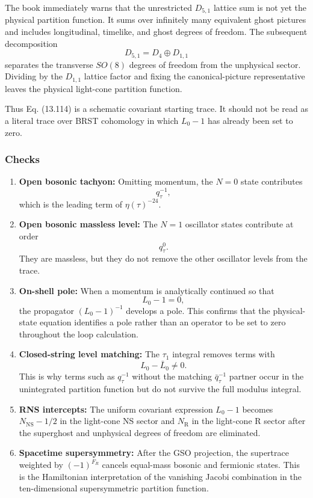 \documentclass[
  10pt,
  a4paper,
  openany]{book}
\begin{document}
The book immediately warns that the unrestricted \(D_{5,1}\) lattice sum
is not yet the physical partition function. It sums over infinitely many
equivalent ghost pictures and includes longitudinal, timelike, and ghost
degrees of freedom. The subsequent decomposition \[
D_{5,1}=D_4\oplus D_{1,1}
\] separates the transverse \(SO(8)\) degrees of freedom from the
unphysical sector. Dividing by the \(D_{1,1}\) lattice factor and fixing
the canonical-picture representative leaves the physical light-cone
partition function.

Thus Eq. (13.114) is a schematic covariant starting trace. It should not
be read as a literal trace over BRST cohomology in which \(L_0-1\) has
already been set to zero.

\subsubsection{Checks}\label{checks-16}

\begin{enumerate}
\def\labelenumi{\arabic{enumi}.}
\item
  \textbf{Open bosonic tachyon:} Omitting momentum, the \(N=0\) state
  contributes \[
  q_\tau^{-1},
  \] which is the leading term of \(\eta(\tau)^{-24}\).
\item
  \textbf{Open bosonic massless level:} The \(N=1\) oscillator states
  contribute at order \[
  q_\tau^0.
  \] They are massless, but they do not remove the other oscillator
  levels from the trace.
\item
  \textbf{On-shell pole:} When a momentum is analytically continued so
  that \[
  L_0-1=0,
  \] the propagator \((L_0-1)^{-1}\) develops a pole. This confirms that
  the physical-state equation identifies a pole rather than an operator
  to be set to zero throughout the loop calculation.
\item
  \textbf{Closed-string level matching:} The \(\tau_1\) integral removes
  terms with \[
  L_0-\bar L_0\neq0.
  \] This is why terms such as \(q_\tau^{-1}\) without the matching
  \(\bar q_\tau^{-1}\) partner occur in the unintegrated partition
  function but do not survive the full modulus integral.
\item
  \textbf{RNS intercepts:} The uniform covariant expression \(L_0-1\)
  becomes \(N_{\mathrm{NS}}-1/2\) in the light-cone NS sector and
  \(N_{\mathrm R}\) in the light-cone R sector after the superghost and
  unphysical degrees of freedom are eliminated.
\item
  \textbf{Spacetime supersymmetry:} After the GSO projection, the
  supertrace weighted by \((-1)^{F_R}\) cancels equal-mass bosonic and
  fermionic states. This is the Hamiltonian interpretation of the
  vanishing Jacobi combination in the ten-dimensional supersymmetric
  partition function.
\end{enumerate}
\end{document}
